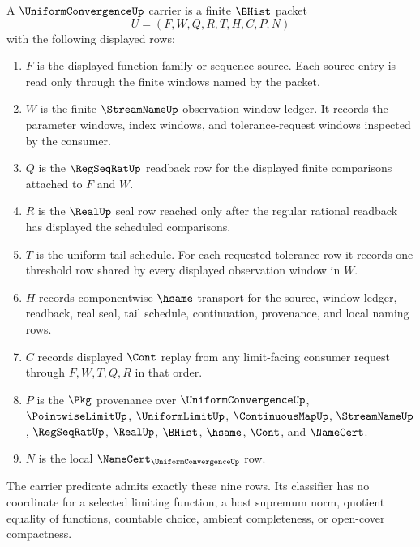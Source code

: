 \begin{definition}
\label{def:uniform-convergence-carrier}
A $\UniformConvergenceUp$ carrier is a finite $\BHist$ packet
$$
U=(F,W,Q,R,T,H,C,P,N)
$$
with the following displayed rows:
\begin{enumerate}
\item $F$ is the displayed function-family or sequence source. Each source entry is read only through the finite windows named by the packet.
\item $W$ is the finite $\StreamNameUp$ observation-window ledger. It records the parameter windows, index windows, and tolerance-request windows inspected by the consumer.
\item $Q$ is the $\RegSeqRatUp$ readback row for the displayed finite comparisons attached to $F$ and $W$.
\item $R$ is the $\RealUp$ seal row reached only after the regular rational readback has displayed the scheduled comparisons.
\item $T$ is the uniform tail schedule. For each requested tolerance row it records one threshold row shared by every displayed observation window in $W$.
\item $H$ records componentwise $\hsame$ transport for the source, window ledger, readback, real seal, tail schedule, continuation, provenance, and local naming rows.
\item $C$ records displayed $\Cont$ replay from any limit-facing consumer request through $F,W,T,Q,R$ in that order.
\item $P$ is the $\Pkg$ provenance over $\UniformConvergenceUp$, $\PointwiseLimitUp$, $\UniformLimitUp$, $\ContinuousMapUp$, $\StreamNameUp$, $\RegSeqRatUp$, $\RealUp$, $\BHist$, $\hsame$, $\Cont$, and $\NameCert$.
\item $N$ is the local $\NameCert_{\UniformConvergenceUp}$ row.
\end{enumerate}
The carrier predicate admits exactly these nine rows. Its classifier has no coordinate for a selected limiting function, a host supremum norm, quotient equality of functions, countable choice, ambient completeness, or open-cover compactness.
\end{definition}


